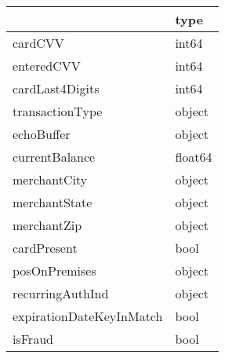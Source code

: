 \begin{tabu}{ll}
\toprule
 & type \\
\midrule
cardCVV & int64 \\
enteredCVV & int64 \\
cardLast4Digits & int64 \\
transactionType & object \\
echoBuffer & object \\
currentBalance & float64 \\
merchantCity & object \\
merchantState & object \\
merchantZip & object \\
cardPresent & bool \\
posOnPremises & object \\
recurringAuthInd & object \\
expirationDateKeyInMatch & bool \\
isFraud & bool \\
\bottomrule
\end{tabu}